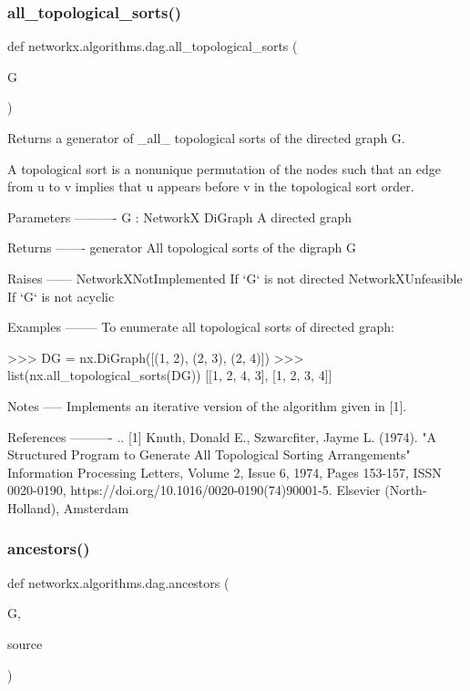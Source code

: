 \subsubsection{\texorpdfstring{all\+\_\+topological\+\_\+sorts()}{all\_topological\_sorts()}}
{\footnotesize\ttfamily def networkx.\+algorithms.\+dag.\+all\+\_\+topological\+\_\+sorts (\begin{DoxyParamCaption}\item[{}]{G }\end{DoxyParamCaption})}

\begin{DoxyVerb}Returns a generator of _all_ topological sorts of the directed graph G.

A topological sort is a nonunique permutation of the nodes such that an
edge from u to v implies that u appears before v in the topological sort
order.

Parameters
----------
G : NetworkX DiGraph
    A directed graph

Returns
-------
generator
    All topological sorts of the digraph G

Raises
------
NetworkXNotImplemented
    If `G` is not directed
NetworkXUnfeasible
    If `G` is not acyclic

Examples
--------
To enumerate all topological sorts of directed graph:

>>> DG = nx.DiGraph([(1, 2), (2, 3), (2, 4)])
>>> list(nx.all_topological_sorts(DG))
[[1, 2, 4, 3], [1, 2, 3, 4]]

Notes
-----
Implements an iterative version of the algorithm given in [1].

References
----------
.. [1] Knuth, Donald E., Szwarcfiter, Jayme L. (1974).
   "A Structured Program to Generate All Topological Sorting Arrangements"
   Information Processing Letters, Volume 2, Issue 6, 1974, Pages 153-157,
   ISSN 0020-0190,
   https://doi.org/10.1016/0020-0190(74)90001-5.
   Elsevier (North-Holland), Amsterdam
\end{DoxyVerb}
 \mbox{\label{namespacenetworkx_1_1algorithms_1_1dag_ab5931c11c1d779c650c90cb1594f738e}} 
\subsubsection{\texorpdfstring{ancestors()}{ancestors()}}
{\footnotesize\ttfamily def networkx.\+algorithms.\+dag.\+ancestors (\begin{DoxyParamCaption}\item[{}]{G,  }\item[{}]{source }\end{DoxyParamCaption})}

